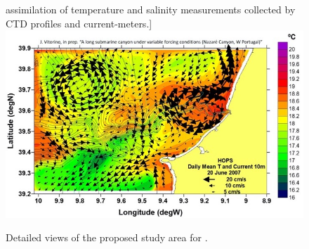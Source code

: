 \begin{figure}[!h]
  assimilation of temperature and salinity measurements collected by
  CTD profiles and
  current-meters.]{\label{fig:model}\includegraphics[scale=0.50]{fig/model.jpeg}}
  \caption{Detailed views of the proposed study area for \proje.}
  \label{fig:studyarea-1}
\end{figure}


